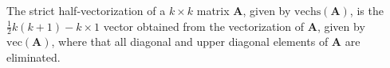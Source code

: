The strict half-vectorization of a 
$
k \times k
$
matrix
$
\mathbf{A}
$,
given by
$
\mathrm{vechs}
\left(
\mathbf{A}
\right)
$,
is the
$
\frac{1}{2}
k
\left( 
k 
+ 
1 
\right)
-
k
\times
1
$
vector obtained from
the vectorization of 
$
\mathbf{A}
$,
given by
$
\mathrm{vec}
\left(
\mathbf{A}
\right)
$,
where that all diagonal and upper diagonal elements of
$
\mathbf{A}
$
are eliminated.
